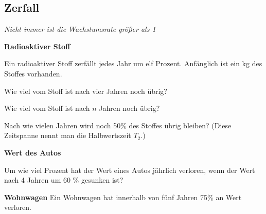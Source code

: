 
\subsection{Zerfall}
\textit{Nicht immer ist die Wachstumsrate größer als 1}

\bbwActAufgabenNr{} \textbf{Radioaktiver Stoff}

Ein radioaktiver Stoff zerfällt jedes Jahr um elf Prozent. Anfänglich ist ein kg des Stoffes vorhanden.

\begin{bbwAufgabenBlock}
\item Wie viel vom Stoff ist nach vier Jahren noch übrig?
\item Wie viel vom Stoff ist nach $n$ Jahren noch übrig?
\item Nach wie vielen Jahren wird noch 50\% des Stoffes übrig bleiben? (Diese Zeitspanne nennt man die Halbwertszeit $T_2$.)
\end{bbwAufgabenBlock}
\platzFuerBerechnungenBisEndeSeite{}






\bbwActAufgabenNr{} \textbf{Wert des Autos}

Um wie viel Prozent hat der Wert eines Autos jährlich verloren, wenn
der Wert nach 4 Jahren um 60 \% gesunken ist?
\nextBbwAufgabenNummer%
\platzFuerBerechnungenBisEndeSeite{}



\bbwActAufgabenNr{} \textbf{Wohnwagen}
Ein Wohnwagen hat innerhalb von fünf Jahren 75\% an Wert verloren. 

